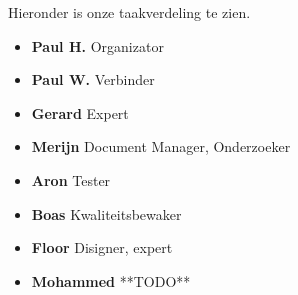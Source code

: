 \documentclass{article}
\begin{document}
Hieronder is onze taakverdeling te zien.

\begin{itemize}
  \item \textbf{Paul H.}  Organizator
  \item \textbf{Paul W.}  Verbinder 
  \item \textbf{Gerard} Expert 
  \item \textbf{Merijn} Document Manager, Onderzoeker
  \item \textbf{Aron} Tester
  \item \textbf{Boas} Kwaliteitsbewaker 
  \item \textbf{Floor} Disigner, expert
  \item \textbf{Mohammed} **TODO**
\end{itemize}
\end{document}

